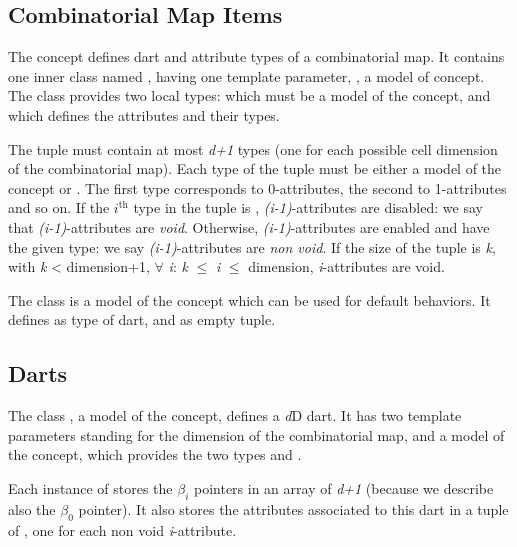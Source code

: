 \subsection{Combinatorial Map Items}\label{ssec-item}

The  concept defines dart and attribute
types of a combinatorial map. It contains one inner class named
, having one template parameter, , a model
of  concept.  The  class
provides two local types:  which must be a model of the
 concept, and  which defines the attributes
and their types.

The  tuple must contain at most \emph{d+1} types (one for
each possible cell dimension of the combinatorial map).  Each type of
the tuple must be either a model of the  concept or
.  The first type corresponds to 0-attributes, the second to
1-attributes and so on. If the $i^{\mbox{th}}$ type in the tuple is
, \emph{(i-1)}-attributes are disabled: we say that
\emph{(i-1)}-attributes are \emph{void}.  Otherwise, \emph{(i-1)}-attributes are
enabled and have the given type: we say \emph{(i-1)}-attributes are
\emph{non void}.  If the size of the tuple is \emph{k}, with \emph{k} <
dimension+1, $\forall$ \emph{i}: \emph{k} $\leq$ \emph{i} $\leq$ dimension, \emph{i}-attributes are
void.

The class  is a model of the
 concept which can be used for default behaviors.
It defines  as type of dart, and
 as empty tuple.

\subsection{Darts}\label{ssec-darts}

The class , a model of the  concept,
defines a \emph{d}D dart. It has two template parameters standing for the
dimension of the combinatorial map, and a model of the
 concept, which provides the two types
 and . 

Each instance  of  stores the $\beta_i$ pointers in an
array of \emph{d+1}  (because we describe also the
$\beta_0$ pointer).  It also stores the attributes associated to this
dart in a tuple of , one for each
non void \emph{i}-attribute.

